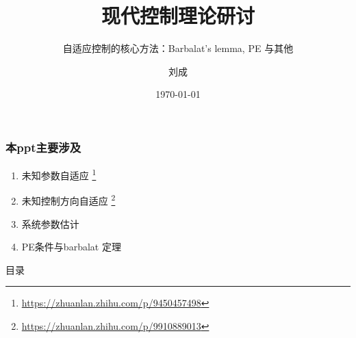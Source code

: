 \documentclass{beamer}
\title{现代控制理论研讨}
\subtitle{自适应控制的核心方法：Barbalat's lemma, PE 与其他}
\author{刘成}
\institute{中山大学 航空航天学院}
\date{\today}
\begin{document}
\begin{frame}
  \titlepage
\end{frame}

\begin{frame}
  \frametitle{本ppt主要涉及}
  \begin{enumerate}
    \item 未知参数自适应 \footnote{\url{https://zhuanlan.zhihu.com/p/9450457498}}
    \item 未知控制方向自适应 \footnote{\url{https://zhuanlan.zhihu.com/p/9910889013}}
    \item 系统参数估计
    \item PE条件与barbalat 定理 
  \end{enumerate}
\end{frame}

\begin{frame}{目录}
  \tableofcontents[sectionstyle=show/shaded, subsectionstyle=show/show/shaded]
\end{frame}



\end{document}
